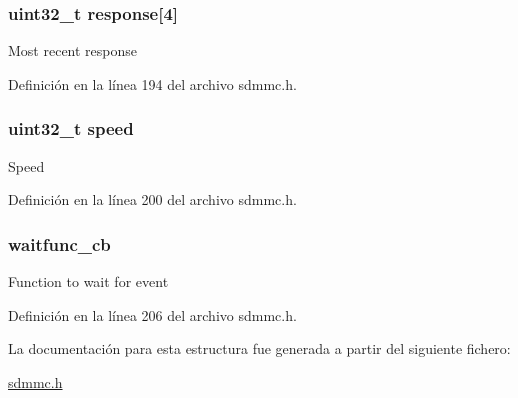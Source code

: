 \subsubsection[{\texorpdfstring{response}{response}}]{\setlength{\rightskip}{0pt plus 5cm}uint32\+\_\+t response\mbox{[}4\mbox{]}}\hypertarget{struct_s_d_m_m_c___c_a_r_d___t_af8dec199f0e5b3e398572384f304a9b9}{}\label{struct_s_d_m_m_c___c_a_r_d___t_af8dec199f0e5b3e398572384f304a9b9}
Most recent response 

Definición en la línea 194 del archivo sdmmc.\+h.

\subsubsection[{\texorpdfstring{speed}{speed}}]{\setlength{\rightskip}{0pt plus 5cm}uint32\+\_\+t speed}\hypertarget{struct_s_d_m_m_c___c_a_r_d___t_a220859a8b5da0232739a11cbe7f79fc5}{}\label{struct_s_d_m_m_c___c_a_r_d___t_a220859a8b5da0232739a11cbe7f79fc5}
Speed 

Definición en la línea 200 del archivo sdmmc.\+h.

\subsubsection[{\texorpdfstring{waitfunc\+\_\+cb}{waitfunc_cb}}]{ waitfunc\+\_\+cb}\hypertarget{struct_s_d_m_m_c___c_a_r_d___t_aba83ee702d85b5e9dc7f00a9561a200c}{}\label{struct_s_d_m_m_c___c_a_r_d___t_aba83ee702d85b5e9dc7f00a9561a200c}
Function to wait for event 

Definición en la línea 206 del archivo sdmmc.\+h.



La documentación para esta estructura fue generada a partir del siguiente fichero\+:\begin{DoxyCompactItemize}
\item 
\hyperlink{sdmmc_8h}{sdmmc.\+h}\end{DoxyCompactItemize}
